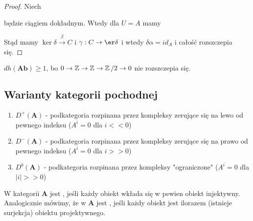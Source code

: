 \begin{proof}
  Niech  będzie ciągiem dokładnym. Wtedy dla $U=A$ mamy
  \begin{center}\end{center}
  Stąd mamy $\ker \delta\xrightarrow{\beta} C$ i $\gamma:C\to \er\delta$ i wtedy $\delta\alpha=id_A$ i całość rozszczepia się.
\end{proof}

\begin{conclusion}
  $dh(\mathbf{Ab})\geq 1$, bo $0\to \operatorname{\mathbb{Z}}\to \operatorname{\mathbb{Z}}\to \operatorname{\mathbb{Z}}/2\to 0$ nie rozszczepia się.
\end{conclusion}

\subsection{Warianty kategorii pochodnej}

\begin{enumerate}
  \item $D^+(\mathbf{A})$ - podkategoria rozpinana przez kompleksy zerujące się na lewo od pewnego indeksu ($A^i=0$ dla $i<<0$)
  \item $D^-(\mathbf{A})$ - podkategoria rozpinana przez kompleksy zerujące się na prawo od pewnego indeksu ($A^i=0$ dla $i>>0$)
  \item $D^b(\mathbf{A})$ - podkategoria rozpinana przez kompleksy "ograniczone" ($A^i=0$ dla $|i|>>0$)
\end{enumerate}

\begin{definition}
  W kategorii $\mathbf{A}$ jest , jeśli każdy obiekt wkłada się w pewien obiekt injektywny. Analogicznie mówimy, że w $\mathbf{A}$ jest , jeśli każdy obiekt jest ilorazem (istnieje surjekcja) obiektu projektywnego.
\end{definition}


